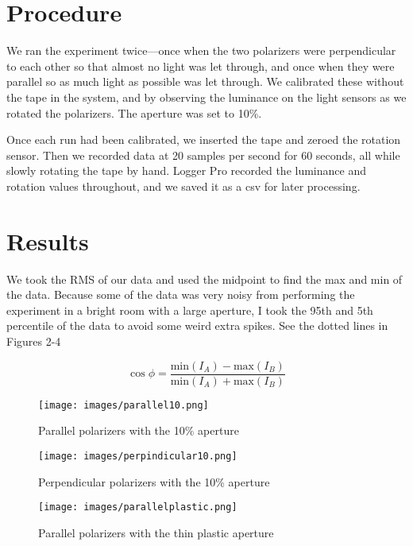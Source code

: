 \documentclass[12pt,letterpaper]{article}
\begin{document}
\section{Procedure}

We ran the experiment twice—once when the two polarizers were perpendicular to each other so that almost no light was let through, and once when they were parallel so as much light as possible was let through. We calibrated these without the tape in the system, and by observing the luminance on the light sensors as we rotated the polarizers. The aperture was set to 10\%.

Once each run had been calibrated, we inserted the tape and zeroed the rotation sensor. Then we recorded data at 20 samples per second for 60 seconds, all while slowly rotating the tape by hand. Logger Pro recorded the luminance and rotation values throughout, and we saved it as a csv for later processing.

\section{Results}

We took the RMS of our data and used the midpoint to find the max and min of the data. Because some of the data was very noisy from performing the experiment in a bright room with a large aperture, I took the 95th and 5th percentile of the data to avoid some weird extra spikes. See the dotted lines in Figures 2-4

\begin{equation}
    \cos\phi=\frac{\text{min}(I_A)-\text{max}(I_B)}{\text{min}(I_A)+\text{max}(I_B)}
\end{equation}

\begin{figure}[ht]
    \centering
    \texttt{[image: images/parallel10.png]}
    \caption{Parallel polarizers with the 10\% aperture}
    \label{fig:||10}
\end{figure}

\begin{figure}[ht]
    \centering
    \texttt{[image: images/perpindicular10.png]}
    \caption{Perpendicular polarizers with the 10\% aperture}
    \label{fig:||10}
\end{figure}

\begin{figure}[ht]
    \centering
    \texttt{[image: images/parallelplastic.png]}
    \caption{Parallel polarizers with the thin plastic aperture}
    \label{fig:||10}
\end{figure}
\end{document}
